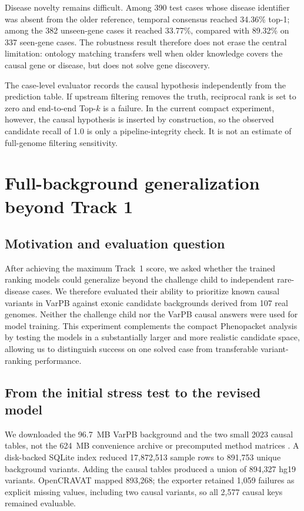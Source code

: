 \documentclass[11pt]{article}
\begin{document}
Disease novelty remains difficult. Among 390 test cases whose disease identifier was absent from the older reference, temporal consensus reached 34.36\% top-1; among the 382 unseen-gene cases it reached 33.77\%, compared with 89.32\% on 337 seen-gene cases. The robustness result therefore does not erase the central limitation: ontology matching transfers well when older knowledge covers the causal gene or disease, but does not solve gene discovery.

The case-level evaluator records the causal hypothesis independently from the prediction table. If upstream filtering removes the truth, reciprocal rank is set to zero and end-to-end Top-$k$ is a failure. In the current compact experiment, however, the causal hypothesis is inserted by construction, so the observed candidate recall of 1.0 is only a pipeline-integrity check. It is not an estimate of full-genome filtering sensitivity.

\section{Full-background generalization beyond Track 1}

\subsection{Motivation and evaluation question}

After achieving the maximum Track~1 score, we asked whether the trained ranking models could generalize beyond the challenge child to independent rare-disease cases. We therefore evaluated their ability to prioritize known causal variants in VarPB against exonic candidate backgrounds derived from 107 real genomes. Neither the challenge child nor the VarPB causal answers were used for model training. This experiment complements the compact Phenopacket analysis by testing the models in a substantially larger and more realistic candidate space, allowing us to distinguish success on one solved case from transferable variant-ranking performance.

\subsection{From the initial stress test to the revised model}

We downloaded the 96.7~MB VarPB background and the two small 2023 causal tables, not the 624~MB convenience archive or precomputed method matrices \citep{varpb2023}. A disk-backed SQLite index reduced 17,872,513 sample rows to 891,753 unique background variants. Adding the causal tables produced a union of 894,327 hg19 variants. OpenCRAVAT mapped 893,268; the exporter retained 1,059 failures as explicit missing values, including two causal variants, so all 2,577 causal keys remained evaluable.
\end{document}

